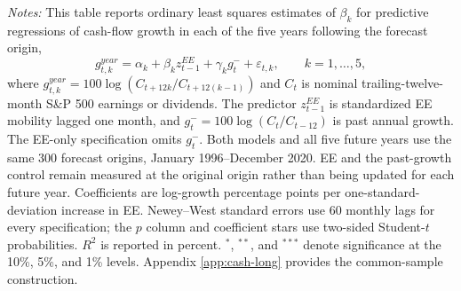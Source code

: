 \begin{table}[H]
\begin{minipage}[t]{\linewidth}\exhibitnotestyle
\setlength{\abovedisplayskip}{3pt}\setlength{\belowdisplayskip}{3pt}
\setlength{\abovedisplayshortskip}{3pt}\setlength{\belowdisplayshortskip}{3pt}
\textit{Notes:} This table reports ordinary least squares estimates of $\beta_k$ for predictive regressions of cash-flow growth in each of the five years following the forecast origin,
\[g^{year}_{t,k}=\alpha_k+\beta_k z_{t-1}^{EE}+\gamma_k g_t^-+\varepsilon_{t,k},
\qquad k=1,\ldots,5,\]
where $g^{year}_{t,k}=100\log(C_{t+12k}/C_{t+12(k-1)})$ and $C_t$ is nominal trailing-twelve-month S\&P 500 earnings or dividends. The predictor $z_{t-1}^{EE}$ is standardized EE mobility lagged one month, and $g_t^-=100\log(C_t/C_{t-12})$ is past annual growth. The EE-only specification omits $g_t^-$. Both models and all five future years use the same 300 forecast origins, January 1996--December 2020. EE and the past-growth control remain measured at the original origin rather than being updated for each future year. Coefficients are log-growth percentage points per one-standard-deviation increase in EE. Newey--West standard errors use 60 monthly lags for every specification; the $p$ column and coefficient stars use two-sided Student-$t$ probabilities. $R^2$ is reported in percent. $^{*}$, $^{**}$, and $^{***}$ denote significance at the 10\%, 5\%, and 1\% levels. Appendix \ref{app:cash-long} provides the common-sample construction.\par\end{minipage}
\end{table}

